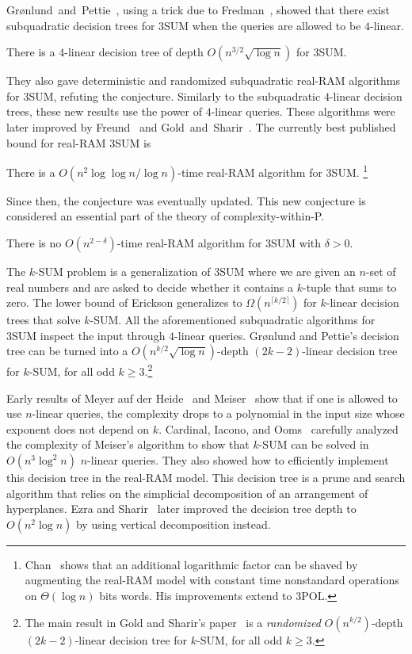 Gr\o nlund~and~Pettie~\cite{GP14}, using a trick due to Fredman~\cite{F76},
showed that there exist subquadratic decision trees for 3SUM when the queries
are allowed to be $4$-linear.
\begin{theorem}
There is a $4$-linear decision tree of depth
$O(n^{3/2} \sqrt{\log n})$ for 3SUM\@.
\end{theorem}
They also gave deterministic and randomized
subquadratic real-RAM algorithms for 3SUM, refuting the conjecture.
Similarly to the subquadratic $4$-linear decision trees, these new results
use the power of $4$-linear queries.
%
These algorithms were later improved by Freund~\cite{F15} and
Gold~and~Sharir~\cite{GS15}.
The currently best published bound for real-RAM 3SUM is
\begin{theorem}
There is a $O(n^2 \log \log n / \log n)$-time real-RAM algorithm
for 3SUM\@.%
\footnote{Chan~\cite{Ch18} shows that an additional logarithmic factor can be shaved
by augmenting the real-RAM model with constant time nonstandard operations on
$\Theta(\log n)$ bits words. His improvements extend to 3POL.}
\end{theorem}
Since then, the conjecture was eventually updated. This new conjecture is
considered an essential part of the theory of complexity-within-P.
\begin{conjecture}\label{conj:3sum}
	There is no $O(n^{2-\delta})$-time real-RAM algorithm for 3SUM with
	$\delta > 0$.
\end{conjecture}

The
$k$-SUM problem is a generalization of 3SUM where we are given an $n$-set of
real numbers and are asked to decide whether it contains a $k$-tuple that sums
to zero. The lower bound of Erickson generalizes to \( \Omega (n^{\lceil k/2
\rceil }) \) for \( k \)-linear decision trees that solve \( k \)-SUM\@.
All the aforementioned subquadratic algorithms for 3SUM inspect the input
through $4$-linear queries.  Gr\o nlund and Pettie's decision tree can be
turned into a \( O(n^{k/2} \sqrt{\log{n}}) \)-depth $(2k-2)$-linear decision
tree for $k$-SUM, for all odd $k \geq 3$.\footnote{The main result in Gold and Sharir's paper~\cite{GS15}
is a \emph{randomized} \(O(n^{k/2})\)-depth \((2k-2)\)-linear decision tree for
\(k\)-SUM, for all odd \(k \geq 3\).}

Early results of Meyer auf der Heide~\cite{M84} and Meiser~\cite{M93} show that if one is allowed to
use $n$-linear queries, the complexity drops to a polynomial in the input size
whose exponent does not depend on $k$. Cardinal, Iacono, and
Ooms~\cite{CIO16}
carefully analyzed the complexity of Meiser's algorithm to show that $k$-SUM
can be solved in \( O(n^3 \log^2 n) \) $n$-linear queries. They also showed how
to efficiently implement this decision tree in the real-RAM model. This decision
tree is a prune and search algorithm that relies on the simplicial
decomposition of an arrangement of hyperplanes. Ezra and
Sharir~\cite{ES17}
later improved the decision tree depth to \( O(n^2 \log n) \) by using
vertical decomposition instead.
%

